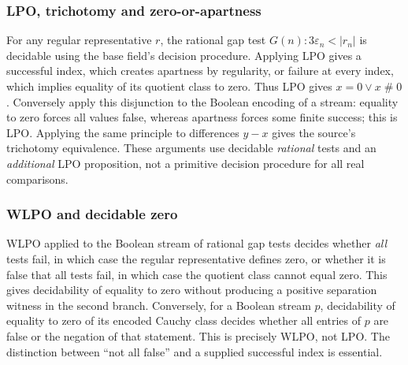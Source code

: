 \documentclass[11pt,reqno]{amsart}
\theoremstyle{definition}\newtheorem{definition}[theorem]{Definition}
\theoremstyle{remark}\newtheorem{remark}[theorem]{Remark}
\newcommand{\eps}{\varepsilon}
\newcommand{\Apt}{\mathrel{\#}}
\begin{document}
\medskip
\subsubsection*{LPO, trichotomy and zero-or-apartness}\label{supp:14-2}
For any regular representative $r$, the rational gap test $G(n):3\eps_n<|r_n|$ is decidable using the base field's decision procedure. Applying LPO gives a successful index, which creates apartness by regularity, or failure at every index, which implies equality of its quotient class to zero. Thus LPO gives $x=0\lor x\Apt0$. Conversely apply this disjunction to the Boolean encoding of a stream: equality to zero forces all values false, whereas apartness forces some finite success; this is LPO. Applying the same principle to differences $y-x$ gives the source's trichotomy equivalence. These arguments use decidable \emph{rational} tests and an \emph{additional} LPO proposition, not a primitive decision procedure for all real comparisons.
\medskip
\medskip
\subsubsection*{WLPO and decidable zero}\label{supp:14-3}
WLPO applied to the Boolean stream of rational gap tests decides whether \emph{all} tests fail, in which case the regular representative defines zero, or whether it is false that all tests fail, in which case the quotient class cannot equal zero. This gives decidability of equality to zero without producing a positive separation witness in the second branch. Conversely, for a Boolean stream $p$, decidability of equality to zero of its encoded Cauchy class decides whether all entries of $p$ are false or the negation of that statement. This is precisely WLPO, not LPO. The distinction between ``not all false'' and a supplied successful index is essential.
\medskip
\end{document}

